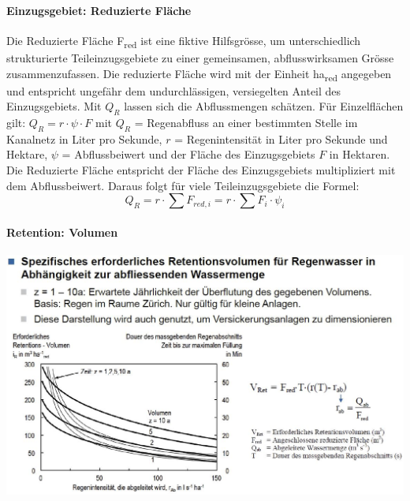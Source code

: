 \documentclass[9pt, openright=false]{scrartcl}
\begin{document}
\paragraph{Einzugsgebiet: Reduzierte Fläche} Die Reduzierte Fläche F\textsubscript{red} ist eine fiktive Hilfsgrösse, um unterschiedlich strukturierte Teileinzugsgebiete zu einer gemeinsamen, abflusswirksamen Grösse zusammenzufassen. Die reduzierte Fläche wird mit der Einheit ha\textsubscript{red} angegeben und entspricht ungefähr dem undurchlässigen, versiegelten Anteil des Einzugsgebiets. Mit $Q_R$ lassen sich die Abflussmengen schätzen. Für Einzelflächen gilt: $Q_R = r \cdot \psi \cdot F$ mit $Q_R$ = Regenabfluss an einer bestimmten Stelle im Kanalnetz in Liter pro Sekunde, $r$ = Regenintensität in Liter pro Sekunde und Hektare, $\psi$ = Abflussbeiwert und der Fläche des Einzugsgebiets $F$ in Hektaren. Die Reduzierte Fläche entspricht der Fläche des Einzugsgebiets multipliziert mit dem Abflussbeiwert. Daraus folgt für viele Teileinzugsgebiete die Formel:\[Q_R = r \cdot \sum F_{red,i} = r \cdot \sum F_i \cdot \psi_i\]
\paragraph{Retention: Volumen}
\begin{center}
\includegraphics[width=.8\textwidth]{images/retentionsvolumen}
\end{center}
\end{document}
